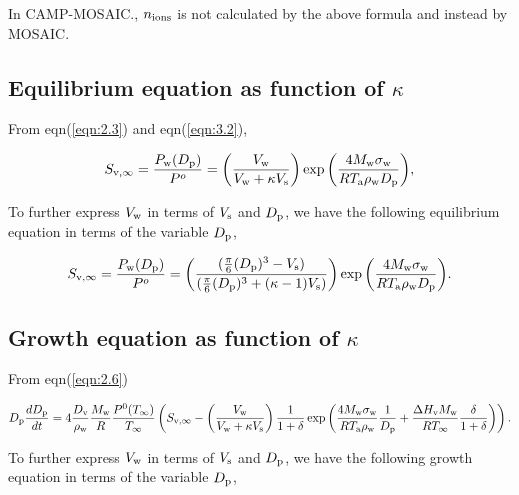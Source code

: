 \documentclass[12pt]{article}
\begin{document}
In CAMP-MOSAIC., $n_{\rm ions}$ is not calculated by the above formula and instead by MOSAIC.

\subsection{Equilibrium equation as function of $\kappa$}

From eqn(\ref{eqn:2.3}) and eqn(\ref{eqn:3.2}),

\begin{equation}\label{eqn:3.9}
S_{\rm v, \infty}=\frac{P_{\rm w}(D_{\rm p})}{P^{o}}=\left(\frac{V_{\rm w}}{V_{\rm w} + \kappa V_{\rm s}}\right)   \exp{\left(\frac{4 M_{\rm w} \sigma_{\rm w}}{R T_{\rm a} \rho_{\rm w} D_{\rm p}}\right)},
\end{equation}

To further express $V_{\rm w}$ in terms of $V_{\rm s}$ and $ D_{\rm p}$, we have the following equilibrium equation in terms of the variable $D_{\rm p}$, 

\begin{equation}\label{eqn:3.11}
S_{\rm v, \infty}=\frac{P_{\rm w}(D_{\rm p})}{P^{o}}=\left(\frac{(\frac{\pi}{6}(D_{\rm p})^{3}-V_{\rm s}) }{(\frac{\pi}{6}(D_{\rm p})^{3}+(\kappa-1)V_{\rm s})}\right) \exp{\left(\frac{4 M_{\rm w} \sigma_{\rm w}}{R T_{\rm a} \rho_{\rm w} D_{\rm p}}\right)}.
\end{equation}


\subsection{Growth equation as function of $\kappa$ }

From eqn(\ref{eqn:2.6})

\begin{equation}\label{eqn:3.12}
D_{\rm p}\frac{dD_{\rm p}}{dt}=4 \frac{D_{\rm v}} {\rho_{\rm w}} \frac{M_{\rm w}}{R} \frac{P^{\rm 0}(T_{\infty})} {T_{\infty}} \left(S_{\rm v, \infty} -  \left(\frac{V_{\rm w}}{V_{\rm w} + \kappa V_{\rm s}}\right) \frac{1}{1+\delta} \exp \left(\frac{4 M_{\rm w}\sigma_{\rm w}}{R T_{\rm a} \rho_{\rm w}}\frac{1}{D_{\rm p}}+\frac{\Delta H_{\rm v} M_{\rm w}}{R T_{\infty}} \frac{\delta}{1+\delta}\right)\right).
\end{equation}

To further express $V_{\rm w}$ in terms of $V_{\rm s}$ and $ D_{\rm p}$, we have the following growth equation in terms of the variable $D_{\rm p}$,
\end{document}
